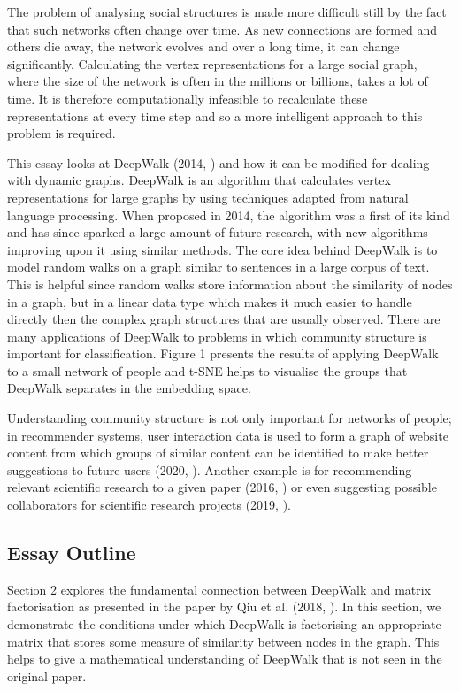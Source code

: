 \documentclass[a4paper]{article}
\begin{document}
The problem of analysing social structures is made more difficult still by the
fact that such networks often change over time. As new connections are formed
and others die away, the network evolves and over a long time, it can
change significantly. Calculating the vertex representations for a large social
graph, where the size of the network is often in the millions or billions, takes
a lot of time. It is therefore computationally infeasible to recalculate these
representations at every time step and so a more intelligent approach to this
problem is required.

This essay looks at DeepWalk (2014, \cite{deepwalk}) and how it can be modified for dealing with dynamic
graphs. DeepWalk is an algorithm that calculates vertex representations for
large graphs by using techniques adapted from natural language processing. When proposed in 2014,
 the algorithm was a first of its kind and has since sparked a large amount of future research, with new
algorithms improving upon it using similar methods. The core idea behind DeepWalk is to model random walks
on a graph similar to sentences in a large corpus of text. This is helpful since random walks store information
about the similarity of nodes in a graph, but in a linear data type which makes it much easier to handle directly then the
complex graph structures that are usually observed. There are many applications of DeepWalk to problems in which community structure is important for classification. Figure 1 presents the results of applying DeepWalk to a small network of people and t-SNE helps to visualise the groups that DeepWalk separates in the embedding space.

Understanding community structure is not only important for networks of people; in recommender systems, user interaction data is used to form a graph of website content from which groups of similar content can be identified to make better suggestions to future users (2020, \cite{bai2020}). Another example is for recommending relevant scientific research to a given paper (2016, \cite{zhao2016}) or even suggesting possible collaborators for scientific research projects (2019, \cite{xu2019}).


\subsection{Essay Outline}
Section 2 explores the fundamental connection between DeepWalk and
matrix factorisation as presented in the paper by Qiu et al. (2018, \cite{qiu2018}). In
this section, we demonstrate the conditions under which DeepWalk is factorising
an appropriate matrix that stores some measure of similarity between
nodes in the graph. This helps to give a mathematical understanding of DeepWalk that is not seen in the original paper.
\end{document}

